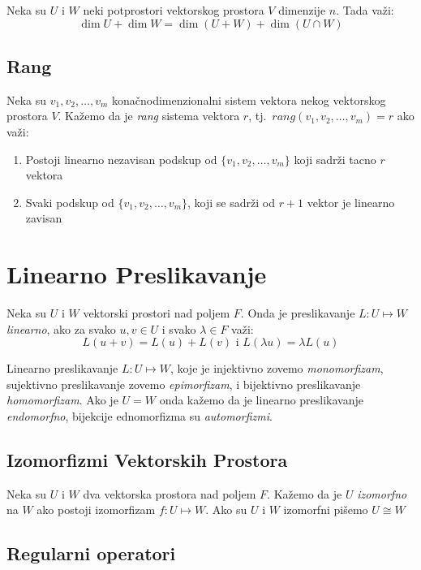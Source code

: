 \documentclass[12p,a4paper]{article}
\begin{document}
\begin{multicols}{2}
    Neka su $U$ i $W$ neki potprostori vektorskog prostora $V$ dimenzije $n$. 
    Tada važi:
    \[\dim U + \dim W = \dim(U + W) + \dim(U \cap W)\]

\subsection{Rang}

    Neka su $v_1, v_2, \ldots, v_m$ konačnodimenzionalni sistem vektora nekog 
    vektorskog prostora $V$. Kažemo da je \textit{rang} sistema vektora 
    $r$, tj.\ $ rang (v_1, v_2, \ldots, v_m) = r$ ako važi:
    \begin{enumerate}
        \itemsep0em
        \item Postoji linearno nezavisan podskup od 
            $\{v_1, v_2, \ldots, v_m \}$ koji sadrži tacno $r$ vektora
        \item Svaki podskup od $\{v_1, v_2, \ldots, v_m \}$, koji se sadrži 
            od $r + 1$ vektor je linearno zavisan
    \end{enumerate}

\section{Linearno Preslikavanje}

    Neka su $U$ i $W$ vektorski prostori nad poljem $F$. Onda je preslikavanje 
    $L: U \mapsto W$ \textit{linearno}, ako za svako $u, v \in U$ i svako 
    $\lambda \in F$ važi:
    \[ L(u + v) = L(u) + L(v) \text{  i  } L(\lambda u) = \lambda L(u)\]

    Linearno preslikavanje $L : U \mapsto W$, 
    koje je injektivno zovemo \textit{monomorfizam}, 
    sujektivno preslikavanje zovemo \textit{epimorfizam}, 
    i bijektivno preslikavanje \textit{homomorfizam}. 
    Ako je $U = W$ onda kažemo da je linearno preslikavanje 
    \textit{endomorfno}, bijekcije ednomorfizma su \textit{automorfizmi}.

\subsection{Izomorfizmi Vektorskih Prostora}

    Neka su $U$ i $W$ dva vektorska prostora nad poljem $F$. Kažemo da je $U$ 
    \textit{izomorfno} na $W$ ako postoji izomorfizam $f : U \mapsto W$. 
    Ako su $U$ i $W$ izomorfni pišemo $U \cong W$

\subsection{Regularni operatori}


\end{multicols}
\end{document}
